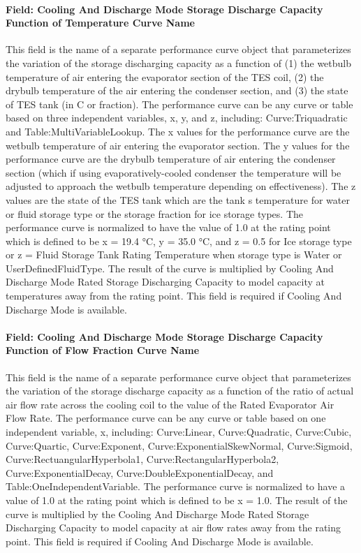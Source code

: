 \paragraph{Field: Cooling And Discharge Mode Storage Discharge Capacity Function of Temperature Curve Name}\label{field-cooling-and-discharge-mode-storage-discharge-capacity-function-of-temperature-curve-name}

This field is the name of a separate performance curve object that parameterizes the variation of the storage discharging capacity as a function of (1) the wetbulb temperature of air entering the evaporator section of the TES coil, (2) the drybulb temperature of the air entering the condenser section, and (3) the state of TES tank (in C or fraction). The performance curve can be any curve or table based on three independent variables, x, y, and z, including: Curve:Triquadratic and Table:MultiVariableLookup. The x values for the performance curve are the wetbulb temperature of air entering the evaporator section. The y values for the performance curve are the drybulb temperature of air entering the condenser section (which if using evaporatively-cooled condenser the temperature will be adjusted to approach the wetbulb temperature depending on effectiveness). The z values are the state of the TES tank which are the tank s temperature for water or fluid storage type or the storage fraction for ice storage types. The performance curve is normalized to have the value of 1.0 at the rating point which is defined to be x = 19.4 °C, y = 35.0 °C, and z = 0.5 for Ice storage type or z = Fluid Storage Tank Rating Temperature when storage type is Water or UserDefinedFluidType. The result of the curve is multiplied by Cooling And Discharge Mode Rated Storage Discharging Capacity to model capacity at temperatures away from the rating point. This field is required if Cooling And Discharge Mode is available.

\paragraph{Field: Cooling And Discharge Mode Storage Discharge Capacity Function of Flow Fraction Curve Name}\label{field-cooling-and-discharge-mode-storage-discharge-capacity-function-of-flow-fraction-curve-name}

This field is the name of a separate performance curve object that parameterizes the variation of the storage discharge capacity as a function of the ratio of actual air flow rate across the cooling coil to the value of the Rated Evaporator Air Flow Rate. The performance curve can be any curve or table based on one independent variable, x, including: Curve:Linear, Curve:Quadratic, Curve:Cubic, Curve:Quartic, Curve:Exponent, Curve:ExponentialSkewNormal, Curve:Sigmoid, Curve:RectuangularHyperbola1, Curve:RectangularHyperbola2, Curve:ExponentialDecay, Curve:DoubleExponentialDecay, and Table:OneIndependentVariable. The performance curve is normalized to have a value of 1.0 at the rating point which is defined to be x = 1.0. The result of the curve is multiplied by the Cooling And Discharge Mode Rated Storage Discharging Capacity to model capacity at air flow rates away from the rating point. This field is required if Cooling And Discharge Mode is available.

